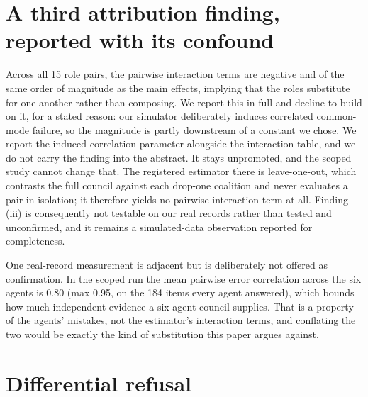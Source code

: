 \section{A third attribution finding, reported with its confound}
\label{app:third-finding}

Across all 15 role pairs, the pairwise interaction terms are negative and of the same order of
magnitude as the main effects, implying that the roles substitute for one another rather than
composing. We report this in full and decline to build on it, for a stated reason: our simulator
deliberately induces correlated common-mode failure, so the magnitude is partly downstream of a
constant we chose. We report the induced correlation parameter alongside the interaction table, and
we do not carry the finding into the abstract. It stays unpromoted, and the scoped study cannot
change that. The registered estimator there is leave-one-out, which contrasts the full council
against each drop-one coalition and never evaluates a pair in isolation; it therefore yields no
pairwise interaction term at all. Finding (iii) is consequently not testable on our real records
rather than tested and unconfirmed, and it remains a simulated-data observation reported for
completeness.

One real-record measurement is adjacent but is deliberately not offered as confirmation. In the
scoped run the mean pairwise error correlation across the six agents is 0.80 (max 0.95, on the 184
items every agent answered), which bounds how much independent evidence a six-agent council supplies.
That is a property of the agents' mistakes, not the estimator's interaction terms, and conflating the
two would be exactly the kind of substitution this paper argues against.

\section{Differential refusal}
\label{app:refusal}

